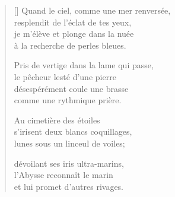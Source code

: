 \documentclass[11pt,a4paper]{book}
\begin{document}
\newpage


\settowidth{\versewidth}{Quand le ciel, comme une mer renversée,}

\bigskip

\begin{verse}[\versewidth]
  Quand le ciel, comme une mer renversée, \\
  resplendit de l'éclat de tes yeux, \\
  je m'élève et plonge dans la nuée \\
  à la recherche de perles bleues.

  Pris de vertige dans la lame qui passe, \\
  le pêcheur lesté d'une pierre \\
  désespérément coule une brasse \\
  comme une rythmique prière.

  Au cimetière des étoiles \\
  s'irisent deux blancs coquillages, \\
  lunes sous un linceul de voiles;

  dévoilant ses iris ultra-marins, \\
  l'Abysse reconnaît le marin \\
  et lui promet d'autres rivages.
\end{verse}

\newpage


\settowidth{\versewidth}{l'haleine coupée à chaque descente,}

\bigskip
\end{document}

